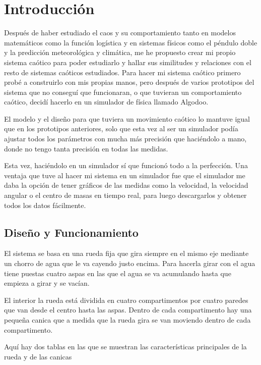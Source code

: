 \documentclass[
  10pt,
  a4paper,
  DIV=11,
  numbers=noendperiod,
  open=any]{scrreprt}
\numberwithin{equation}{chapter}
\numberwithin{equation}{section}
\renewcommand{\[}{\begin{equation}}
\renewcommand{\]}{\end{equation}}
\begin{document}
\chapter{Introducción}\label{introducciuxf3n-6}

Después de haber estudiado el caos y su comportamiento tanto en modelos
matemáticos como la función logística y en sistemas físicos como el
péndulo doble y la predicción meteorológica y climática, me he propuesto
crear mi propio sistema caótico para poder estudiarlo y hallar sus
similitudes y relaciones con el resto de sistemas caóticos estudiados.
Para hacer mi sistema caótico primero probé a construirlo con mis
propias manos, pero después de varios prototipos del sistema que no
conseguí que funcionaran, o que tuvieran un comportamiento caótico, decidí
hacerlo en un simulador de física llamado Algodoo.

El modelo y el diseño para que tuviera un movimiento caótico lo mantuve
igual que en los prototipos anteriores, solo que esta vez al ser un
simulador podía ajustar todos los parámetros con mucha más precisión que
haciéndolo a mano, donde no tengo tanta precisión en todas las medidas.

Esta vez, haciéndolo en un simulador sí que funcionó todo a la
perfección. Una ventaja que tuve al hacer mi sistema en un simulador fue
que el simulador me daba la opción de tener gráficos de las medidas como
la velocidad, la velocidad angular o el centro de masas en tiempo real, para luego descargarlos y obtener todos los datos fácilmente.

\section{Diseño y Funcionamiento}\label{diseuxf1o-y-funcionamiento}

El sistema se basa en una rueda fija que gira siempre en el mismo eje
mediante un chorro de agua que le va cayendo justo encima. Para hacerla
girar con el agua tiene puestas cuatro aspas en las que el agua se va
acumulando hasta que empieza a girar y se vacían.

El interior la rueda está dividida en cuatro compartimentos por cuatro
paredes que van desde el centro hasta las aspas. Dentro de cada
compartimento hay una pequeña canica que a medida que la rueda gira se
van moviendo dentro de cada compartimento.

Aquí hay dos tablas en las que se muestran las características
principales de la rueda y de las canicas
\end{document}
